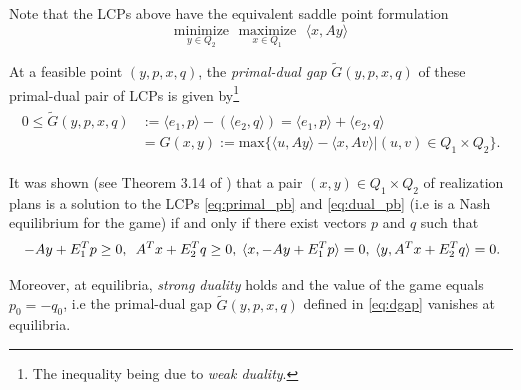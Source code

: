 \documentclass{article} %
\begin{document}
Note that the LCPs above have the equivalent saddle point formulation
\begin{equation}
  \underset{y \in Q_2}{\text{minimize}}\text{ }\underset{x \in
    Q_1}{\text{maximize}}\text{ }\langle x, Ay\rangle
  \label{eq:gilpin}
\end{equation}

At a feasible point $(y, p, x, q)$, the \textit{primal-dual gap}
$\tilde{G}(y, p, x, q)$ of these primal-dual pair of LCPs is given
by\footnote{The inequality being due to \textit{weak duality}.}
\begin{eqnarray}
  \begin{split}
  0 \le \tilde{G}(y, p, x, q) &:= \langle e_1, p\rangle - (\langle
  e_2, q\rangle) = \langle e_1, p\rangle + \langle
  e_2, q\rangle\\
  &= G(x, y) := \mathrm{max}\{\langle u, Ay\rangle - \langle x, Av\rangle |
(u,v) \in Q_1 \times Q_2\}.
\end{split}
  \label{eq:dgap}
\end{eqnarray}

It was shown (see Theorem 3.14 of \cite{vonequilibrium}) that a pair
$(x, y) \in Q_1 \times Q_2$ of realization plans is a solution to the
LCPs \eqref{eq:primal_pb} and \eqref{eq:dual_pb} (i.e is a Nash
equilibrium for the game)  if and only if there exist vectors $p$ and
$q$ such that
\begin{equation}
\hspace{.25em} -Ay + E_1^Tp \ge 0, \hspace{.5em}A^Tx + E_2^Tq \ge
0, \hspace{.25em} \langle x, -Ay + E_1^Tp\rangle = 0, \hspace{.25em}
\langle y, A^Tx  + E_2^Tq\rangle = 0.
\label{eq:feasibility}
\end{equation}

Moreover, at equilibria, \textit{strong duality} holds and the value
of the game equals $p_0 = -q_0$, i.e the primal-dual gap
$\tilde{G}(y, p, x, q)$ defined in \eqref{eq:dgap} vanishes at
equilibria.


\end{document}
